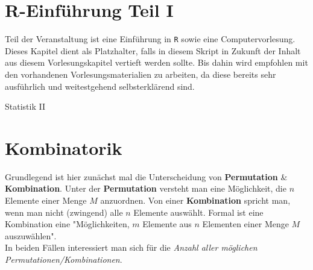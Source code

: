 \documentclass[a4paper]{article}
\begin{document}
\clearpage


\section{R-Einführung Teil I}

Teil der Veranstaltung ist eine Einführung in \texttt{R} sowie eine Computervorlesung. Dieses Kapitel dient als Platzhalter, falls in diesem Skript in Zukunft der Inhalt aus diesem Vorlesungskapitel vertieft werden sollte. Bis dahin wird empfohlen mit den vorhandenen Vorlesungsmaterialien zu arbeiten, da diese bereits sehr ausführlich und weitestgehend selbsterklärend sind.

\clearpage

\hspace{0pt}
\vfill
\begin{center}
    {\Huge Statistik II}
\end{center}
\vfill
\hspace{0pt}


\clearpage


\section{Kombinatorik}

Grundlegend ist hier zunächst mal die Unterscheidung von \textbf{Permutation} \& \textbf{Kombination}.
Unter der \textbf{Permutation} versteht man eine Möglichkeit, die $n$ Elemente einer Menge $M$ anzuordnen. Von einer \textbf{Kombination} spricht man, wenn man nicht (zwingend) alle $n$ Elemente auswählt. Formal ist eine Kombination eine "Möglichkeiten, $m$ Elemente aus $n$ Elementen einer Menge $M$ auszuwählen".\\
In beiden Fällen interessiert man sich für die \textit{Anzahl aller möglichen Permutationen/Kombinationen}.
\end{document}
